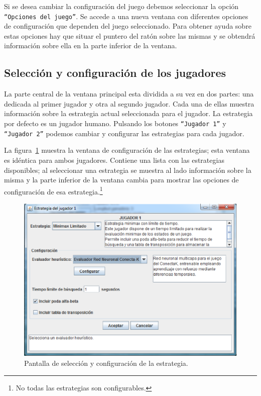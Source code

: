 Si se desea cambiar la configuración del juego debemos seleccionar la opción \texttt{``Opciones del juego''}.
Se accede a una nueva ventana con diferentes opciones de configuración que dependen del juego seleccionado.
Para obtener ayuda sobre estas opciones hay que situar el puntero del ratón sobre las mismas y se obtendrá información sobre ella en la parte inferior de la ventana.

\subsection{Selección y configuración de los jugadores}
\label{ssec:funcionamiento_jugadores}
La parte central de la ventana principal esta dividida a su vez en dos partes: una dedicada al primer jugador y otra al segundo jugador.
Cada una de ellas muestra información sobre la estrategia actual seleccionada para el jugador.
La estrategia por defecto es un jugador humano.
Pulsando los botones \texttt{``Jugador 1''} y \texttt{``Jugador 2''} podemos cambiar y configurar las estrategias para cada jugador.

La figura~\ref{fig:ventana_estrategia} muestra la ventana de configuración de las estrategias; esta ventana es idéntica para ambos jugadores.
Contiene una lista con las estrategias disponibles; al seleccionar una estrategia se muestra al lado información sobre la misma y la parte inferior de la ventana cambia para mostrar las opciones de configuración de esa estrategia.\footnote{No todas las estrategias son configurables.}

\begin{figure}[!h]
	\centering
	\includegraphics[scale=0.4]{contenido/apendiceA/imagenes/ventanaEstrategias.eps}
	\caption{Pantalla de selección y configuración de la estrategia.}
	\label{fig:ventana_estrategia}
\end{figure}

